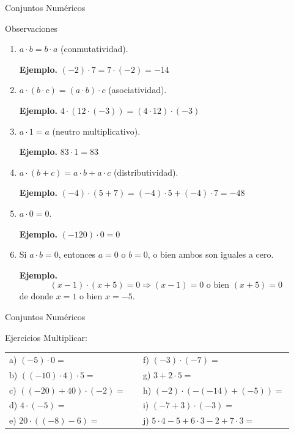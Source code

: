 \documentclass[handout,10pt]{beamer}
\begin{document}
	\begin{frame}{Conjuntos Numéricos}
		\begin{block}{Observaciones}
			\begin{enumerate}
				\item $a\cdot b=b\cdot a$ (conmutatividad).
				
				\textbf{Ejemplo.} $(-2)\cdot 7=7\cdot (-2)=-14$
				\pause
				
				\item $a\cdot (b\cdot c)=(a\cdot b)\cdot c$ (asociatividad).
				
				\textbf{Ejemplo.} $4\cdot(12\cdot(-3))=(4\cdot12)\cdot(-3)$
				\pause
				
				\item $a\cdot1=a$ (neutro multiplicativo).
				
				\textbf{Ejemplo.} $83\cdot1=83$
				\pause
				
				\item $a\cdot(b+c)=a\cdot b+a\cdot c$ (distributividad).
				
				\textbf{Ejemplo.} $(-4)\cdot(5+7)=(-4)\cdot5+(-4)\cdot7=-48$
				\pause
				
				\item $a\cdot0=0$.
				
				\textbf{Ejemplo.} $(-120)\cdot0=0$
				\pause
				
				\item Si $a\cdot b=0$, entonces $a=0$ o $b=0$, o bien ambos son iguales a cero.
				
				\textbf{Ejemplo.}
				\[
				(x-1)\cdot(x+5)=0 \Longrightarrow (x-1)=0 \text{ o bien } (x+5)=0
				\]
				de donde $x=1$ o bien $x=-5$.
			\end{enumerate}
		\end{block}
	\end{frame}
	
	\begin{frame}{Conjuntos Numéricos}
		\begin{block}{Ejercicios}
			Multiplicar:
			
			\begin{tabular}{lll}
				a) $(-5)\cdot0=$\pause &  & f) $(-3)\cdot(-7)=$\pause \\
				b) $((-10)\cdot4)\cdot5=$\pause &  & g) $3+2\cdot5=$\pause \\
				c) $((-20)+40)\cdot(-2)=$\pause &  & h) $(-2)\cdot(-(-14)+(-5))=$\pause \\
				d) $4\cdot(-5)=$\pause &  & i) $(-7+3)\cdot(-3)=$\pause \\
				e) $20\cdot((-8)-6)=$\pause &  & j) $5\cdot4-5+6\cdot3-2+7\cdot3=$
			\end{tabular}
		\end{block}
	\end{frame}
	
\end{document}
